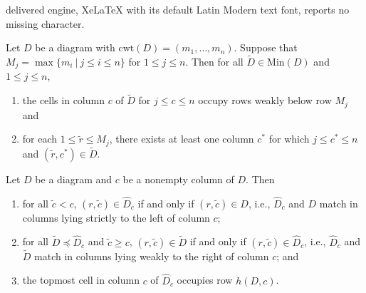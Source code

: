 \documentclass[10pt,a4paper]{amsart}
\begin{document}
delivered engine, XeLaTeX with its default Latin Modern text font, reports no missing character.
\begin{lemma}\label{lem:minprophelp}
    Let $D$ be a diagram with $\mathrm{cwt}(D)=(m_1,\hdots,m_n)$. Suppose that $M_j=\max\{m_i~|~j\le i\le n\}$ for $1\le j\le n$. Then for all $\tilde{D}\in\mathrm{Min}(D)$ and $1\le j\le n$,
    \begin{enumerate}
        \item[$(i)$] the cells in column $c$ of $\tilde{D}$ for $j\le c\le n$ occupy rows weakly below row $M_j$ and
        \item[$(ii)$] for each $1 \le \tilde{r} \le M_j$, there exists at least one column $c^*$ for which $j\le c^*\le n$ and $(\tilde{r},c^*)\in \tilde{D}$.
    \end{enumerate}
\end{lemma}

\begin{lemma}\label{lem:minprophelp2}
Let $D$ be a diagram and $c$ be a nonempty column of $D$. Then
\begin{enumerate}
    \item[$(i)$] for all $\tilde{c} < c$, $(r, \tilde{c}) \in \widehat{D}_c$ if and only if $(r, \tilde{c}) \in D$, i.e., $\widehat{D}_c$ and $D$ match in columns lying strictly to the left of column $c$;
    \item[$(ii)$] for all $\tilde{D}\preceq\widehat{D}_c$ and $\tilde{c}\ge c$, $(r,\tilde{c})\in \tilde{D}$ if and only if $(r,\tilde{c})\in\widehat{D}_c$, i.e., $\widehat{D}_c$ and $\tilde{D}$ match in columns lying weakly to the right of column $c$; and
    \item[$(iii)$] the topmost cell in column $c$ of $\widehat{D}_c$ occupies row $h(D,c)$.
\end{enumerate}
\end{lemma}
\end{document}
